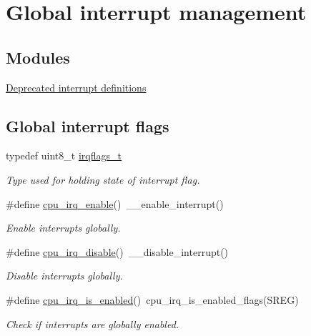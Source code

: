 \hypertarget{group__interrupt__group}{\section{Global interrupt management}
\label{group__interrupt__group}
}
\subsection*{Modules}
\begin{DoxyCompactItemize}
\item 
\hyperlink{group__interrupt__deprecated__group}{Deprecated interrupt definitions}
\end{DoxyCompactItemize}
\subsection*{Global interrupt flags}
\begin{DoxyCompactItemize}
\item 
\hypertarget{group__interrupt__group_ga9aa1f52defc97531b6343233abeea613}{typedef uint8\-\_\-t \hyperlink{group__interrupt__group_ga9aa1f52defc97531b6343233abeea613}{irqflags\-\_\-t}}\label{group__interrupt__group_ga9aa1f52defc97531b6343233abeea613}

\begin{DoxyCompactList}\small\item\em Type used for holding state of interrupt flag. \end{DoxyCompactList}\item 
\hypertarget{group__interrupt__group_gae4922a4bd8ba4150211fbc7f2302403c}{\#define \hyperlink{group__interrupt__group_gae4922a4bd8ba4150211fbc7f2302403c}{cpu\-\_\-irq\-\_\-enable}()~\-\_\-\-\_\-enable\-\_\-interrupt()}\label{group__interrupt__group_gae4922a4bd8ba4150211fbc7f2302403c}

\begin{DoxyCompactList}\small\item\em Enable interrupts globally. \end{DoxyCompactList}\item 
\hypertarget{group__interrupt__group_ga7b77391ed86e2e027f9ee1dd99a06980}{\#define \hyperlink{group__interrupt__group_ga7b77391ed86e2e027f9ee1dd99a06980}{cpu\-\_\-irq\-\_\-disable}()~\-\_\-\-\_\-disable\-\_\-interrupt()}\label{group__interrupt__group_ga7b77391ed86e2e027f9ee1dd99a06980}

\begin{DoxyCompactList}\small\item\em Disable interrupts globally. \end{DoxyCompactList}\item 
\#define \hyperlink{group__interrupt__group_gae1545a2473614564550b9c4015c94978}{cpu\-\_\-irq\-\_\-is\-\_\-enabled}()~cpu\-\_\-irq\-\_\-is\-\_\-enabled\-\_\-flags(S\-R\-E\-G)
\begin{DoxyCompactList}\small\item\em Check if interrupts are globally enabled. \end{DoxyCompactList}\end{DoxyCompactItemize}


